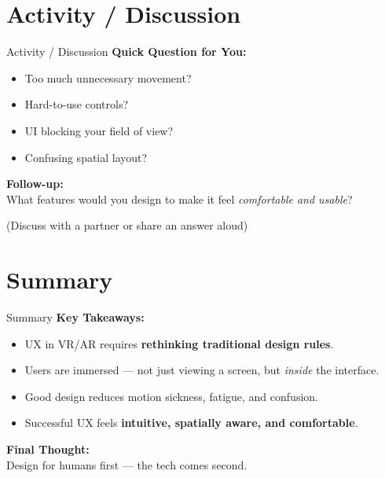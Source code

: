 \documentclass[aspectratio=169, table]{beamer}
\begin{document}
	\section{Activity / Discussion}
	\begin{frame}{Activity / Discussion}
		\vspace{10pt}
		\textbf{Quick Question for You:}
		
		\vspace{8pt}
		\begin{tcolorbox}[colframe=blockborder, colback=gray!05, coltitle=black, title=\textbf{What would frustrate you most in a VR classroom app?}]
			\begin{itemize}
				\item Too much unnecessary movement?
				\item Hard-to-use controls?
				\item UI blocking your field of view?
				\item Confusing spatial layout?
			\end{itemize}
		\end{tcolorbox}
		
		\vspace{10pt}
		\textbf{Follow-up:} \\
		What features would you design to make it feel \textit{comfortable and usable}?
		
		\vspace{6pt}
		\small (Discuss with a partner or share an answer aloud)
	\end{frame}

\section{Summary}
\begin{frame}{Summary}
	\vspace{10pt}
	\textbf{Key Takeaways:}
	
	\vspace{8pt}
	\begin{itemize}
		\item UX in VR/AR requires \textbf{rethinking traditional design rules}.
		\item Users are immersed — not just viewing a screen, but \textit{inside} the interface.
		\item Good design reduces motion sickness, fatigue, and confusion.
		\item Successful UX feels \textbf{intuitive, spatially aware, and comfortable}.
	\end{itemize}
	
	\vspace{10pt}
	\textbf{Final Thought:} \\
	Design for humans first — the tech comes second.
\end{frame}
\end{document}
